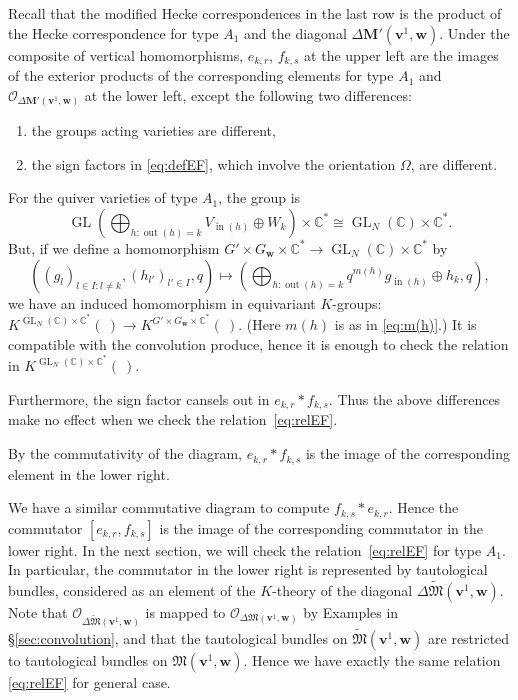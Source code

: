 \documentclass[12pt]{amsart}
\def\Bbb{\mathbb}
\def\frak{\mathfrak}
\renewcommand{\labelenumi}{(\theenumi)}%
\newenvironment{aenume}{%
  \begin{enumerate}%
  \renewcommand{\theenumi}{\alph{enumi}}%
  \renewcommand{\labelenumi}{(\theenumi)}%
  }{\end{enumerate}}
\theoremstyle{definition}
\theoremstyle{remark}
\numberwithin{equation}{subsection}
\newcommand{\secref}[1]{\S\ref{#1}}
\newcommand{\C}{{\Bbb C}}
\newcommand{\GL}{\operatorname{GL}}
\newcommand{\vin}{\operatorname{in}} %
\newcommand{\vout}{\operatorname{out}} %
\newcommand{\bM}{{\mathbf M}} %
\newcommand{\M}{{\frak M}} %
\newcommand{\bv}{{\mathbf v}} %
\newcommand{\bw}{{\mathbf w}} %
\newcommand{\shfO}{\mathcal O}
\newcommand{\Mp}{\widetilde\M}
\begin{document}
Recall that the modified Hecke correspondences in the last row is the
product of the Hecke correspondence for type $A_1$ and the diagonal
$\Delta\bM'(\bv^1,\bw)$.
%
Under the composite of vertical homomorphisms, $e_{k,r}$, $f_{k,s}$ at
the upper left are the images of the exterior products of the
corresponding elements for type $A_1$ and
$\shfO_{\Delta\bM'(\bv^1,\bw)}$ at the lower left, except the
following two differences:
\begin{aenume}
\item the groups acting varieties are different,
\item the sign factors in \eqref{eq:defEF}, which involve the
orientation $\Omega$, are different.
\end{aenume}
%
For the quiver varieties of type $A_1$, the group is
\begin{equation*}
   \GL\left(\bigoplus_{h:\vout(h)=k} V_{\vin(h)}\oplus W_k\right)
   \times \C^*
   \cong \GL_N(\C)\times\C^*.
\end{equation*}
%
But, if we define a homomorphism
$G'\times G_\bw\times \C^* \to \GL_N(\C)\times\C^*$ by
\begin{equation*}
  \left((g_l)_{l\in I:l\neq k}, (h_{l'})_{l'\in I}, q\right)
  \longmapsto
  \left(\bigoplus_{h:\vout(h)=k} q^{m(h)} g_{\vin(h)} \oplus
    h_k, q\right),
\end{equation*}
we have an induced homomorphism in equivariant $K$-groups:
$K^{\GL_N(\C)\times\C^*}(\ )\to
 K^{G'\times G_\bw\times \C^*}(\ )$.
(Here $m(h)$ is as in \eqref{eq:m(h)}.)
It is compatible with the convolution produce, hence it is enough to
check the relation in $K^{\GL_N(\C)\times\C^*}(\ )$.

Furthermore, the sign factor cansels out in $e_{k,r} * f_{k,s}$.
%
Thus the above differences make no effect when we check the
relation~\eqref{eq:relEF}.

By the commutativity of the diagram, $e_{k,r} * f_{k,s}$ is the image of
the corresponding element in the lower right.

We have a similar commutative diagram to compute $f_{k,s} * e_{k,r}$.
%
Hence the commutator $[e_{k,r}, f_{k,s}]$ is the image of the
corresponding commutator in the lower right.
%
In the next section, we will check the relation~\eqref{eq:relEF} for
type $A_1$. In particular, the commutator in the lower right is
represented by tautological bundles, considered as an element of the
$K$-theory of the diagonal $\Delta\Mp(\bv^1,\bw)$. Note that
$\shfO_{\Delta\Mp(\bv^1,\bw)}$ is mapped to
$\shfO_{\Delta\M(\bv^1,\bw)}$ by Examples in \secref{sec:convolution},
and that the tautological bundles on $\Mp(\bv^1,\bw)$ are restricted
to tautological bundles on $\M(\bv^1,\bw)$. Hence we have exactly the
same relation \eqref{eq:relEF} for general case.
\end{document}
